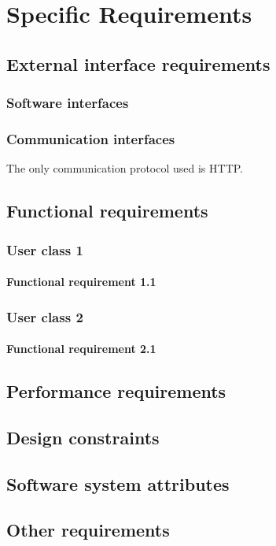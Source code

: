 \chapter{Specific Requirements}


\section{External interface requirements}

\subsection{Software interfaces}
\subsection{Communication interfaces}
The only communication protocol used is HTTP.

\section{Functional requirements}
\subsection{User class 1}
\subsubsection{Functional requirement 1.1}
\subsection{User class 2}
\subsubsection{Functional requirement 2.1}

\section{Performance requirements}
\section{Design constraints}
\section{Software system attributes}
\section{Other requirements}